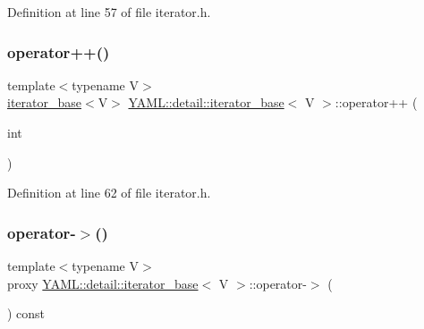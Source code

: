 Definition at line 57 of file iterator.\+h.

\mbox{\label{class_y_a_m_l_1_1detail_1_1iterator__base_af89315017de2d593617a1c317cc97553}} 
\subsubsection{\texorpdfstring{operator++()}{operator++()}\hspace{0.1cm}{\footnotesize\ttfamily [2/2]}}
{\footnotesize\ttfamily template$<$typename V$>$ \\
\mbox{\hyperlink{class_y_a_m_l_1_1detail_1_1iterator__base}{iterator\+\_\+base}}$<$V$>$ \mbox{\hyperlink{class_y_a_m_l_1_1detail_1_1iterator__base}{Y\+A\+M\+L\+::detail\+::iterator\+\_\+base}}$<$ V $>$\+::operator++ (\begin{DoxyParamCaption}\item[{int}]{ }\end{DoxyParamCaption})\hspace{0.3cm}{\ttfamily [inline]}}



Definition at line 62 of file iterator.\+h.

\mbox{\label{class_y_a_m_l_1_1detail_1_1iterator__base_a192eb3e0d063efff425edff5cdb70786}} 
\subsubsection{\texorpdfstring{operator-\/$>$()}{operator->()}}
{\footnotesize\ttfamily template$<$typename V$>$ \\
proxy \mbox{\hyperlink{class_y_a_m_l_1_1detail_1_1iterator__base}{Y\+A\+M\+L\+::detail\+::iterator\+\_\+base}}$<$ V $>$\+::operator-\/$>$ (\begin{DoxyParamCaption}{ }\end{DoxyParamCaption}) const\hspace{0.3cm}{\ttfamily [inline]}}



